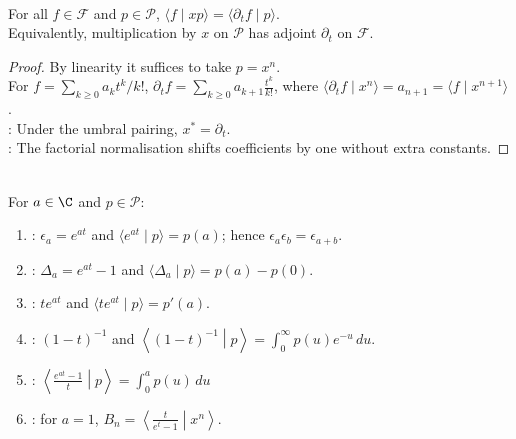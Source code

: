 \begin{theorem} \label{thm:umbral-multiplication-by-x-is-formal-derivative} \\
For all $f\in\mathscr{F}$ and $p\in\mathscr{P}$, $\langle f\mid xp\rangle=\langle \partial_t f\mid p\rangle$.\\
Equivalently, multiplication by $x$ on $\mathscr{P}$ has adjoint $\partial_t$ on $\mathscr{F}$.
\begin{proof}
By linearity it suffices to take $p=x^n$.\\
For $f=\sum\limits_{k\geq0}a_kt^k/k!$, $\partial_t f=\sum\limits_{k\geq0}a_{k+1}\frac{t^k}{k!}$, where $\langle \partial_t f\mid x^n\rangle=a_{n+1} =\langle f\mid x^{n+1}\rangle$.\\
: Under the umbral pairing, $x^{*}=\partial_t$.\\
: The factorial normalisation shifts coefficients by one without extra constants.
\end{proof}
\end{theorem}

\begin{definition} \label{def:umbral-functionals-basic-examples} \\
For $a\in\C$ and $p\in\mathscr{P}$:
\begin{enumerate}[label=(\roman*)]
\setlength{\itemsep}{0pt}
\item {}: $\epsilon_a=e^{at}$ and $\langle e^{at}\mid p\rangle=p(a)$; hence $\epsilon_a\epsilon_b=\epsilon_{a+b}$.
\item {}: $\Delta_a=e^{at}-1$ and $\langle \Delta_a\mid p\rangle=p(a)-p(0)$.
\item {}: $te^{at}$ and $\langle te^{at}\mid p\rangle=p'(a)$.
\item {}: $(1-t)^{-1}$ and $\left\langle(1-t)^{-1}\middle|p\right\rangle =\int_0^\infty p(u)e^{-u}\,du$.
\item {}: $\left\langle\frac{e^{at}-1}{t}\middle|p\right\rangle =\int_0^a p(u)\,du$
\item {}: for $a=1$, $B_n=\left\langle\frac{t}{e^t-1}\middle|x^n\right\rangle$.
\end{enumerate}
\end{definition}

